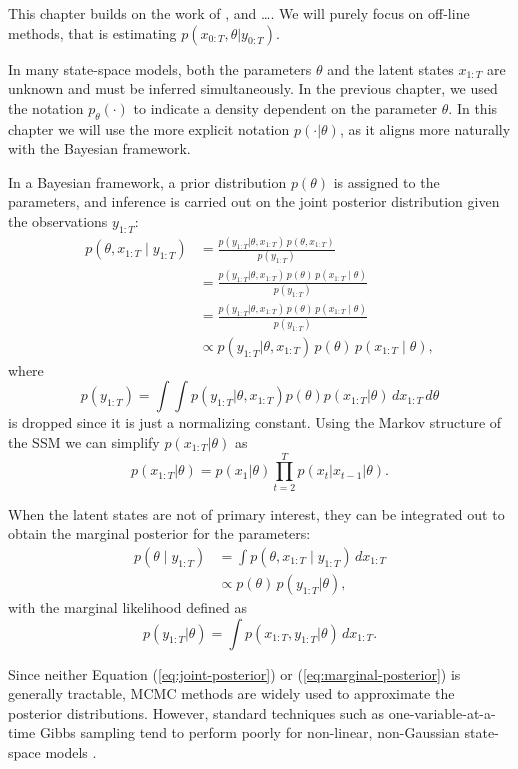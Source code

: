 This chapter builds on the work of \cite{gettingstarted}, \cite{DoucetEstParamSSM} and \dots {}. We will purely focus on off-line methods, that is estimating $p(x_{0:T}, \theta \vert y_{0:T})$. 

In many state-space models, both the parameters $\theta$ and the latent states $x_{1:T}$ are unknown and must be inferred simultaneously. In the previous chapter, we used the notation $p_\theta(\cdot)$ to indicate a density dependent on the parameter $\theta$. In this chapter we will use the more explicit notation $p(\cdot\vert \theta)$, as it aligns more naturally with the Bayesian framework.

In a Bayesian framework, a prior distribution $p(\theta)$ is assigned to the parameters, and inference is carried out on the joint posterior distribution given the observations $y_{1:T}$:
\begin{align}
	p(\theta,x_{1:T}\mid y_{1:T}) &= \frac{p(y_{1:T} \vert \theta, x_{1:T})\, p(\theta, x_{1:T})}{p(y_{1:T})} \nonumber \\
	&= \frac{p(y_{1:T} \vert \theta, x_{1:T})\, p(\theta)\, p(x_{1:T}\mid \theta)}{p(y_{1:T})} \nonumber \\
	&= \frac{p(y_{1:T} \vert \theta, x_{1:T})\, p(\theta)\, p(x_{1:T}\mid \theta)}{p(y_{1:T})} \nonumber \\
	&\propto p(y_{1:T} \vert \theta, x_{1:T})\, p(\theta)\, p(x_{1:T}\mid \theta),
	\label{eq:joint-posterior}
\end{align}
where 
\[
	p(y_{1:T})=\int \int p(y_{1:T}\vert \theta, x_{1:T})p(\theta)p(x_{1:T}\vert \theta)\, dx_{1:T}\, d\theta
\] 
is dropped since it is just a normalizing constant. Using the Markov structure of the \gls*{SSM} we can simplify $p(x_{1:T} \vert \theta)$ as
\[
	p(x_{1:T} \vert \theta)=p(x_1 \vert \theta)\prod_{t=2}^{T}p(x_t\vert x_{t-1}\vert \theta).
\]

When the latent states are not of primary interest, they can be integrated out to obtain the marginal posterior for the parameters:
\begin{align}
	p(\theta\mid y_{1:T}) &= \int p(\theta,x_{1:T}\mid y_{1:T})\,dx_{1:T} \nonumber \\
	&\propto p(\theta)\, p(y_{1:T} \vert \theta),
	\label{eq:marginal-posterior}
\end{align}
with the marginal likelihood defined as
\[
p(y_{1:T}\vert \theta) = \int p(x_{1:T}, y_{1:T}\vert \theta)\,dx_{1:T}.
\]

Since neither Equation (\ref{eq:joint-posterior}) or (\ref{eq:marginal-posterior}) is generally tractable, \gls*{MCMC} methods are widely used to approximate the posterior distributions. However, standard techniques such as one-variable-at-a-time Gibbs sampling tend to perform poorly for non-linear, non-Gaussian state-space models \cite{DoucetEstParamSSM}. 

